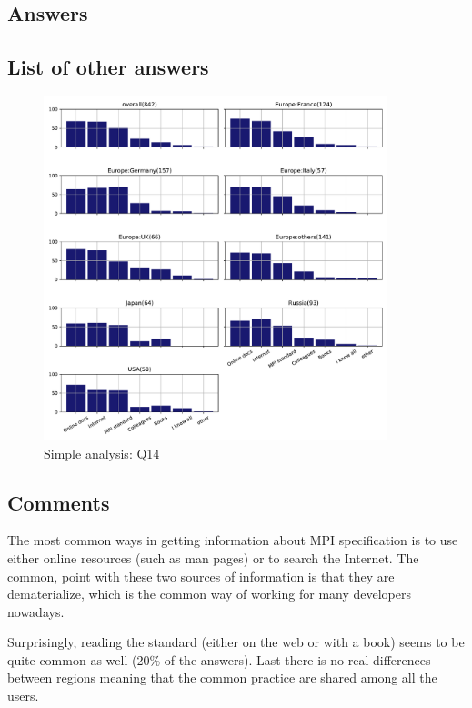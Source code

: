 
\subsection{Answers}



\subsection{List of other answers}
\begin{itemize}

\end{itemize}

\begin{figure}[htb]
\begin{center}
\includegraphics[width=10cm]{../pdfs/Q14.pdf}
\caption{Simple analysis: Q14}
\label{fig:Q14}
\end{center}
\end{figure}

\subsection{Comments}
The most common ways in getting information about MPI specification is to use
either online resources (such as man pages) or to search the Internet. The
common, point with these two sources of information is that they are
dematerialize, which is the common way of working for many developers nowadays.   

Surprisingly, reading the standard (either on the web or with a book) seems to
be quite common as well (20\% of the answers). Last there is no real differences
between regions meaning that the common practice are shared among all the
users. 

